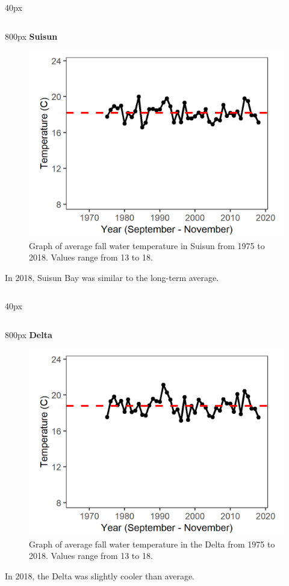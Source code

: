 \documentclass[
]{book}
\begin{document}
\begin{column}{40px\textwidth}
~
\end{column}

\begin{column}{800px\textwidth}
\textbf{Suisun}

\begin{figure}
\includegraphics[width=15.25in]{figures/temp_ssfall} \caption{Graph of average fall water temperature in Suisun from 1975 to 2018. Values range from 13 to 18.}\label{fig:unnamed-chunk-103}
\end{figure}

In 2018, Suisun Bay was similar to the long-term average.
\end{column}

\begin{column}{40px\textwidth}
~
\end{column}

\begin{column}{800px\textwidth}
\textbf{Delta}

\begin{figure}
\includegraphics[width=15.25in]{figures/temp_dtfall} \caption{Graph of average fall water temperature in the Delta from 1975 to 2018. Values range from 13 to 18.}\label{fig:unnamed-chunk-104}
\end{figure}

In 2018, the Delta was slightly cooler than average.
\end{column}
\end{document}
